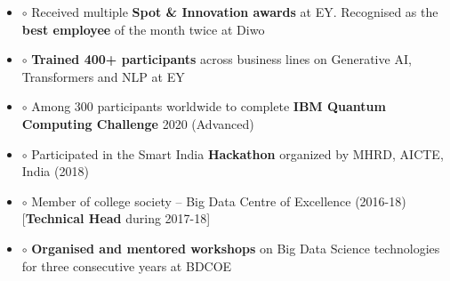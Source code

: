 \documentclass[a4paper,10pt]{article}
\begin{document}
\begin{itemize}
\begin{itemize}
    \item[] $\circ$  \hspace{0.0cm} Received multiple \textbf{Spot \& Innovation awards} at EY. Recognised as the \textbf{best employee} of the month twice at Diwo \\[-0.5cm]
    
    \item[] $\circ$  \hspace{0.0cm} \textbf{Trained 400+ participants} across business lines on Generative AI, Transformers and NLP at EY  \\[-0.5cm]
    
    \item[] $\circ$  \hspace{0.0cm} Among 300 participants worldwide to complete \textbf{IBM Quantum Computing Challenge} 2020 (Advanced) \\[-0.5cm]
    
    \item[] $\circ$  \hspace{0.0cm} Participated in the Smart India \textbf{Hackathon} organized by MHRD, AICTE, India (2018) \\[-0.5cm]
    
    \item[] $\circ$  \hspace{0.0cm} Member of college society -- Big Data Centre of Excellence (2016-18) [\textbf{Technical Head} during  2017-18] \\[-0.55cm]
    
    \item[] $\circ$  \hspace{0.0cm} \textbf{Organised and mentored workshops} on Big Data Science technologies for three consecutive years at BDCOE \\[-0.55cm]
    	
    \end{itemize}
\end{itemize}
\end{document}
